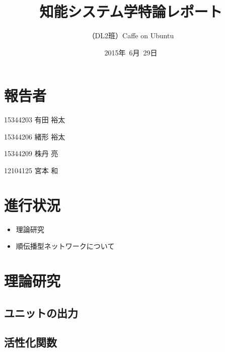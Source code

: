 \documentclass[a4paper,10pt]{jsarticle}
\title{知能システム学特論レポート}
\author{
（DL2班）Caffe on Ubuntu\\
}
\date{2015年\ 6月\ 29日}
\begin{document}
\maketitle
\section{報告者}
\begin{list}{}{}
 \item 15344203\hspace{0.5cm} 有田 裕太
 \item 15344206\hspace{0.5cm} 緒形 裕太
 \item 15344209\hspace{0.5cm} 株丹 亮
 \item 12104125\hspace{0.5cm} 宮本 和
\end{list}

\section{進行状況}

\begin{itemize}
\item 理論研究
\item 順伝播型ネットワークについて
\end{itemize}


\section{理論研究}
\subsection{ユニットの出力}

\subsection{活性化関数}
\end{document}
